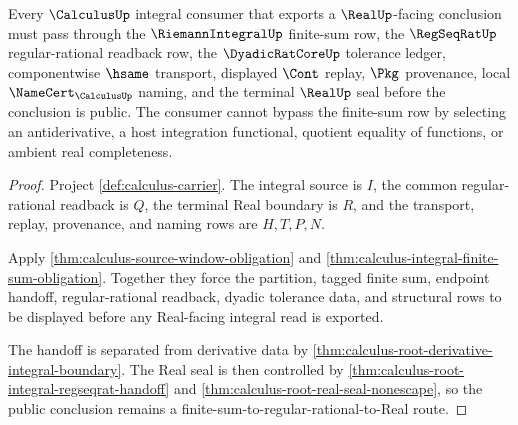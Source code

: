 \begin{theorem}
\label{thm:calculus-root-unblock-finite-sum-handoff}
Every $\CalculusUp$ integral consumer that exports a $\RealUp$-facing conclusion must pass through the $\RiemannIntegralUp$ finite-sum row, the $\RegSeqRatUp$ regular-rational readback row, the $\DyadicRatCoreUp$ tolerance ledger, componentwise $\hsame$ transport, displayed $\Cont$ replay, $\Pkg$ provenance, local $\NameCert_{\CalculusUp}$ naming, and the terminal $\RealUp$ seal before the conclusion is public. The consumer cannot bypass the finite-sum row by selecting an antiderivative, a host integration functional, quotient equality of functions, or ambient real completeness.
\end{theorem}
\begin{proof}
Project \autoref{def:calculus-carrier}. The integral source is $I$, the common regular-rational readback is $Q$, the terminal Real boundary is $R$, and the transport, replay, provenance, and naming rows are $H,T,P,N$.

Apply \autoref{thm:calculus-source-window-obligation} and \autoref{thm:calculus-integral-finite-sum-obligation}. Together they force the partition, tagged finite sum, endpoint handoff, regular-rational readback, dyadic tolerance data, and structural rows to be displayed before any Real-facing integral read is exported.

The handoff is separated from derivative data by \autoref{thm:calculus-root-derivative-integral-boundary}. The Real seal is then controlled by \autoref{thm:calculus-root-integral-regseqrat-handoff} and \autoref{thm:calculus-root-real-seal-nonescape}, so the public conclusion remains a finite-sum-to-regular-rational-to-Real route.
\end{proof}

